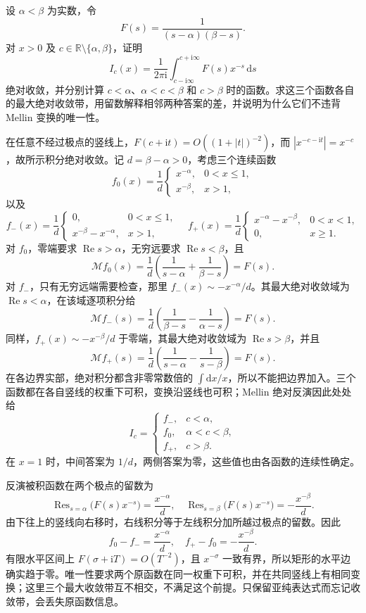 \begin{exercise}[同一表达式的三个反演条带]\label{b3:ex:21-5}
设 \(\alpha<\beta\) 为实数，令
\[
 F(s)=\frac1{(s-\alpha)(\beta-s)}.
\]
对 \(x>0\) 及 \(c\in\mathbb R\setminus\{\alpha,\beta\}\)，证明
\[
 I_c(x)=\frac1{2\pi\mathrm{i}}
 \int_{c-\mathrm{i}\infty}^{c+\mathrm{i}\infty}F(s)x^{-s}\,\mathrm{d}s
\]
绝对收敛，并分别计算 \(c<\alpha\)、\(\alpha<c<\beta\) 和 \(c>\beta\) 时的函数。求这三个函数各自的最大绝对收敛带，用留数解释相邻两种答案的差，并说明为什么它们不违背 Mellin 变换的唯一性。
\end{exercise}
\begin{solution}
在任意不经过极点的竖线上，\(F(c+\mathrm{i}t)=O((1+|t|)^{-2})\)，而 \(|x^{-c-\mathrm{i}t}|=x^{-c}\)，故所示积分绝对收敛。记 \(d=\beta-\alpha>0\)，考虑三个连续函数
\[
 f_0(x)=\frac1d
 \begin{cases}
 x^{-\alpha},&0<x\le1,\\
 x^{-\beta},&x>1,
 \end{cases}
\]
以及
\[
 f_-(x)=\frac1d
 \begin{cases}
 0,&0<x\le1,\\
 x^{-\beta}-x^{-\alpha},&x>1,
 \end{cases}
 \quad
 f_+(x)=\frac1d
 \begin{cases}
 x^{-\alpha}-x^{-\beta},&0<x<1,\\
 0,&x\ge1.
 \end{cases}
\]
对 \(f_0\)，零端要求 \(\operatorname{Re}s>\alpha\)，无穷远要求 \(\operatorname{Re}s<\beta\)，且
\[
 \mathcal Mf_0(s)=\frac1d
 \left(\frac1{s-\alpha}+\frac1{\beta-s}\right)=F(s).
\]
对 \(f_-\)，只有无穷远端需要检查，那里
\(f_-(x)\sim-x^{-\alpha}/d\)。其最大绝对收敛域为 \(\operatorname{Re}s<\alpha\)，在该域逐项积分给
\[
 \mathcal Mf_-(s)=\frac1d
 \left(\frac1{\beta-s}-\frac1{\alpha-s}\right)=F(s).
\]
同样，\(f_+(x)\sim-x^{-\beta}/d\) 于零端，其最大绝对收敛域为 \(\operatorname{Re}s>\beta\)，并且
\[
 \mathcal Mf_+(s)=\frac1d
 \left(\frac1{s-\alpha}-\frac1{s-\beta}\right)=F(s).
\]
在各边界实部，绝对积分都含非零常数倍的 \(\int\mathrm{d}x/x\)，所以不能把边界加入。三个函数都在各自竖线的权重下可积，变换沿竖线也可积；Mellin 绝对反演因此处处给
\[
 I_c=
 \begin{cases}
 f_-,&c<\alpha,\\
 f_0,&\alpha<c<\beta,\\
 f_+,&c>\beta.
 \end{cases}
\]
在 \(x=1\) 时，中间答案为 \(1/d\)，两侧答案为零，这些值也由各函数的连续性确定。

反演被积函数在两个极点的留数为
\[
 \operatorname{Res}_{s=\alpha}\bigl(F(s)x^{-s}\bigr)=\frac{x^{-\alpha}}d,
 \quad
 \operatorname{Res}_{s=\beta}\bigl(F(s)x^{-s}\bigr)=-\frac{x^{-\beta}}d.
\]
由下往上的竖线向右移时，右线积分等于左线积分加所越过极点的留数。因此
\[
 f_0-f_-=\frac{x^{-\alpha}}d,\quad
 f_+-f_0=-\frac{x^{-\beta}}d.
\]
有限水平区间上 \(F(\sigma+\mathrm{i}T)=O(T^{-2})\)，且 \(x^{-\sigma}\) 一致有界，所以矩形的水平边确实趋于零。唯一性要求两个原函数在同一权重下可积，并在共同竖线上有相同变换；这里三个最大收敛带互不相交，不满足这个前提。只保留亚纯表达式而忘记收敛带，会丢失原函数信息。
\end{solution}

